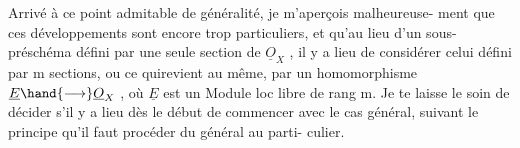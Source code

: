 
Arrivé à ce point admitable de généralité, je m'aperçois malheureuse-%
ment que ces développements sont encore trop particuliers, et qu'au lieu
d'un sous-préschéma défini par une seule section de $\underline{O}_X$ , il y a lieu de
considérer celui défini par m sections, ou ce qui\hand{/}revient au même, par un
homomorphisme $\underline{E} \hand{\longrightarrow} \underline{O}_X$ , où $\underline{E}$ est un Module loc libre de rang m. Je te
laisse le soin de décider s'il y a lieu dès le début de commencer avec le
cas général, suivant le principe qu'il faut procéder du général au parti-%
culier.

